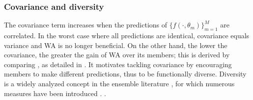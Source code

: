 \subsubsection{Covariance and diversity}
\label{subsec:expression_cov_div}
The covariance term increases when the predictions of $\{f(\cdot, \theta_m)\}_{m=1}^M$ are correlated.
In the worst case where all predictions are identical, covariance equals variance and WA is no longer beneficial.
On the other hand, the lower the covariance, the greater the gain of WA over its members; this is derived by comparing
, as detailed in .
It motivates tackling covariance by encouraging members to make different predictions, thus to be functionally diverse.
Diversity is a widely analyzed concept in the ensemble literature \cite{Lakshminarayanan2017}, for which numerous measures have been introduced \cite{kuncheva2003measures,aksela2003comparison,DBLP:journals/corr/abs-1905-00414}.
.

